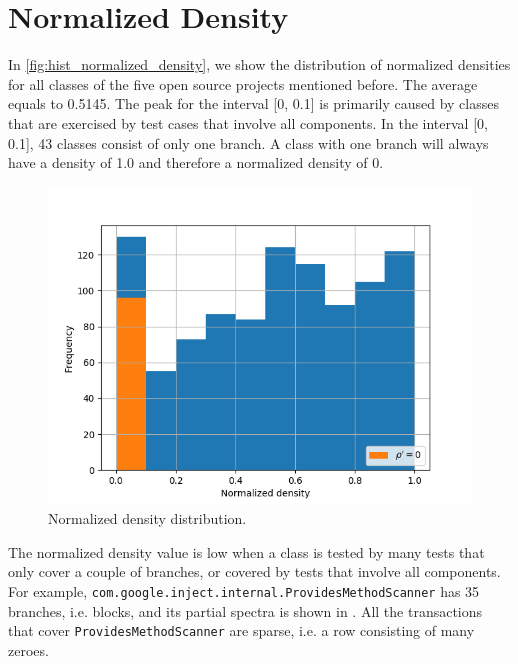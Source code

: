 \documentclass[twoside,a4paper,11pt]{memoir}
\begin{document}
\section{Normalized Density}

In \autoref{fig:hist_normalized_density}, we show the distribution of normalized densities for all classes of the five open source projects mentioned before.
The average equals to 0.5145.
The peak for the interval [0, 0.1] is primarily caused by classes that are exercised by test cases that involve all components.
In the interval [0, 0.1], 43 classes consist of only one branch.
A class with one branch will always have a density of 1.0 and therefore a normalized density of 0.

\begin{figure}
    \centering
    \includegraphics[width=\linewidth]{figures/histogram_normalized_density}
    \caption{Normalized density distribution.}
    \label{fig:hist_normalized_density}
\end{figure}

The normalized density value is low when a class is tested by many tests that only cover a couple of branches, or covered by tests that involve all components.
For example, \texttt{com.google.inject.internal.ProvidesMethodScanner} has 35 branches, i.e. blocks, and its partial spectra is shown in .
All the transactions that cover \texttt{Provides\-Method\-Scanner} are sparse, i.e. a row consisting of many zeroes.
\end{document}

